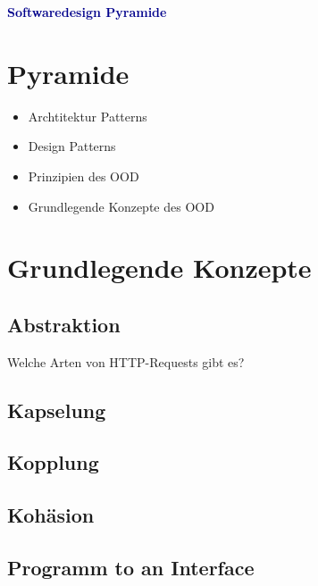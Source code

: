 \textbf{\textcolor{darkblue}{ Softwaredesign Pyramide}}~

\section*{Pyramide}
\begin{itemize}
	\item Archtitektur Patterns
	\item Design Patterns
	\item Prinzipien des OOD
	\item Grundlegende Konzepte des OOD
	
\end{itemize}

\section*{Grundlegende Konzepte}
\subsection*{Abstraktion}
Welche Arten von HTTP-Requests gibt es?
\subsection*{Kapselung}
\subsection*{Kopplung}
\subsection*{Kohäsion}
\subsection*{Programm to an Interface}

